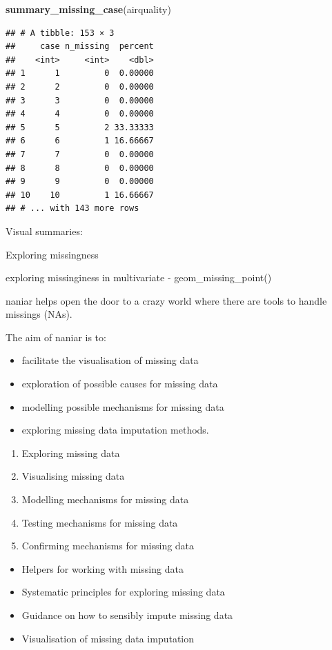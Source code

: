 \documentclass[]{article}
\newenvironment{Shaded}{\begin{snugshade}}{\end{snugshade}}
\newcommand{\KeywordTok}[1]{\textcolor[rgb]{0.13,0.29,0.53}{\textbf{{#1}}}}
\newcommand{\NormalTok}[1]{{#1}}
\providecommand{\tightlist}{%
  \setlength{\itemsep}{0pt}\setlength{\parskip}{0pt}}
\begin{document}
\begin{Shaded}
\begin{Highlighting}[]
\KeywordTok{summary_missing_case}\NormalTok{(airquality)}
\end{Highlighting}
\end{Shaded}

\begin{verbatim}
## # A tibble: 153 × 3
##     case n_missing  percent
##    <int>     <int>    <dbl>
## 1      1         0  0.00000
## 2      2         0  0.00000
## 3      3         0  0.00000
## 4      4         0  0.00000
## 5      5         2 33.33333
## 6      6         1 16.66667
## 7      7         0  0.00000
## 8      8         0  0.00000
## 9      9         0  0.00000
## 10    10         1 16.66667
## # ... with 143 more rows
\end{verbatim}

Visual summaries:

Exploring missingness

exploring missinginess in multivariate - geom\_missing\_point()

naniar helps open the door to a crazy world where there are tools to
handle missings (NAs).

The aim of naniar is to:

\begin{itemize}
\tightlist
\item
  facilitate the visualisation of missing data
\item
  exploration of possible causes for missing data
\item
  modelling possible mechanisms for missing data
\item
  exploring missing data imputation methods.
\end{itemize}

\begin{enumerate}
\def\labelenumi{\arabic{enumi}.}
\tightlist
\item
  Exploring missing data
\item
  Visualising missing data
\item
  Modelling mechanisms for missing data
\item
  Testing mechanisms for missing data
\item
  Confirming mechanisms for missing data
\end{enumerate}

\begin{itemize}
\tightlist
\item
  Helpers for working with missing data
\item
  Systematic principles for exploring missing data
\item
  Guidance on how to sensibly impute missing data
\item
  Visualisation of missing data imputation
\end{itemize}
\end{document}
